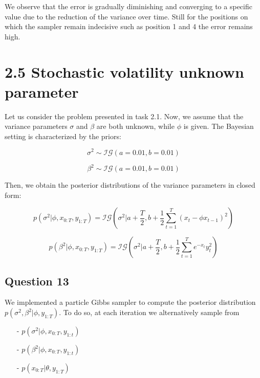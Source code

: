 \documentclass[]{article}
\begin{document}
We observe that the error is gradually diminishing and converging to a specific value due to the reduction of the variance over time. Still for the positions on which the sampler remain indecisive such as position 1 and 4 the error remains high. 

\newpage


\section*{2.5 Stochastic volatility unknown parameter}

Let us consider the problem presented in task 2.1. Now, we assume that the variance parameters $\sigma$ and $\beta$ are both unknown, while $\phi$ is given. The Bayesian setting is characterized by the priors:

$$

\sigma^2 \sim \mathcal{IG}(a=0.01, b=0.01)

$$

$$

\beta^2 \sim \mathcal{IG}(a=0.01, b=0.01)

$$

Then, we obtain the posterior distributions of the variance parameters in closed form:

$$

p(\sigma^2|\phi, x_{0:T}, y_{1:T}) = \mathcal{IG}(\sigma^2|a+\frac{T}{2}, b+\frac{1}{2}\sum_{t=1}^{T}(x_t-\phi x_{t-1})^2)

$$

$$

p(\beta^2|\phi, x_{0:T}, y_{1:T}) = \mathcal{IG}(\sigma^2|a+\frac{T}{2}, b+\frac{1}{2}\sum_{t=1}^{T}e^{-x_t}y_t^2)

$$


\subsection*{Question 13}

We implemented a particle Gibbs sampler to compute the posterior distribution $p(\sigma^2, \beta^2|\phi, y_{1:T})$. To do so, at each iteration we alternatively sample from

\begin{enumerate}

	\item[-] $p(\sigma^2|\phi, x_{0:T}, y_{1:t})$

	\item[-] $p(\beta^2|\phi, x_{0:T}, y_{1:t})$

	\item[-] $p(x_{0:T}|\theta, y_{1:T})$

\end{enumerate}
\end{document}
